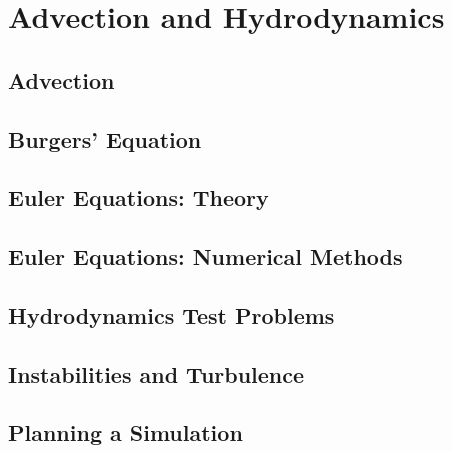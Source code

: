 \documentclass[11pt]{book}
\begin{document}


\part{Advection and Hydrodynamics}

\chapter{Advection}



\chapter{Burgers' Equation}



\chapter{Euler Equations: Theory}




\chapter{Euler Equations: Numerical Methods}




\ifdefined\debugmode
\chapter{Hydrodynamics Test Problems}




\chapter{Instabilities and Turbulence}



\fi

\chapter{Planning a Simulation}
\end{document}
